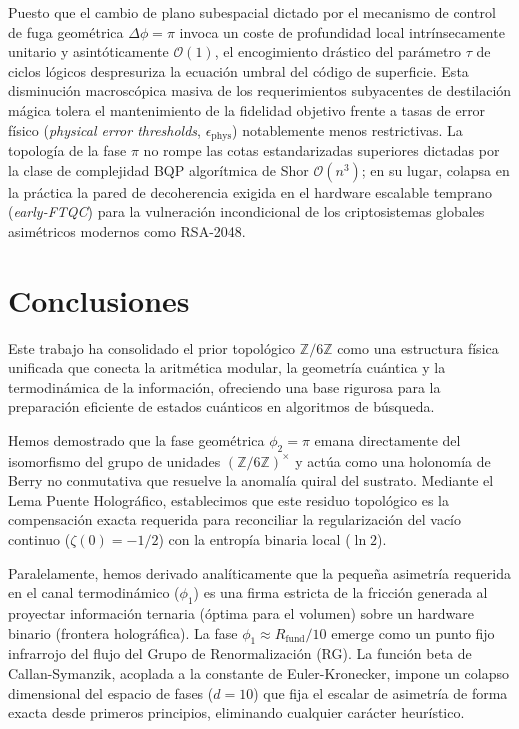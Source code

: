\documentclass[12pt,a4paper]{article}
\theoremstyle{plain}
\theoremstyle{definition}
\theoremstyle{remark}
\begin{document}
Puesto que el cambio de plano subespacial dictado por el mecanismo de control de fuga geométrica $\Delta\phi = \pi$ invoca un coste de profundidad local intrínsecamente unitario y asintóticamente $\mathcal{O}(1)$, el encogimiento drástico del parámetro $\tau$ de ciclos lógicos despresuriza la ecuación umbral del código de superficie. Esta disminución macroscópica masiva de los requerimientos subyacentes de destilación mágica tolera el mantenimiento de la fidelidad objetivo frente a tasas de error físico (\textit{physical error thresholds}, $\epsilon_{\text{phys}}$) notablemente menos restrictivas. La topología de la fase $\pi$ no rompe las cotas estandarizadas superiores dictadas por la clase de complejidad BQP algorítmica de Shor $\mathcal{O}(n^3)$; en su lugar, colapsa en la práctica la pared de decoherencia exigida en el hardware escalable temprano (\textit{early-FTQC}) para la vulneración incondicional de los criptosistemas globales asimétricos modernos como RSA-2048.

\section{Conclusiones}
\label{sec:conclusiones}

Este trabajo ha consolidado el prior topológico $\mathbb{Z}/6\mathbb{Z}$ como una estructura física unificada que conecta la aritmética modular, la geometría cuántica y la termodinámica de la información, ofreciendo una base rigurosa para la preparación eficiente de estados cuánticos en algoritmos de búsqueda.

Hemos demostrado que la fase geométrica $\phi_2 = \pi$ emana directamente del isomorfismo del grupo de unidades $(\mathbb{Z}/6\mathbb{Z})^{\times}$ y actúa como una holonomía de Berry no conmutativa que resuelve la anomalía quiral del sustrato. Mediante el Lema Puente Holográfico, establecimos que este residuo topológico es la compensación exacta requerida para reconciliar la regularización del vacío continuo ($\zeta(0) = -1/2$) con la entropía binaria local ($\ln 2$). 

Paralelamente, hemos derivado analíticamente que la pequeña asimetría requerida en el canal termodinámico ($\phi_1$) es una firma estricta de la fricción generada al proyectar información ternaria (óptima para el volumen) sobre un hardware binario (frontera holográfica). La fase $\phi_1 \approx R_{\text{fund}}/10$ emerge como un punto fijo infrarrojo del flujo del Grupo de Renormalización (RG). La función beta de Callan-Symanzik, acoplada a la constante de Euler-Kronecker, impone un colapso dimensional del espacio de fases ($d=10$) que fija el escalar de asimetría de forma exacta desde primeros principios, eliminando cualquier carácter heurístico.
\end{document}
